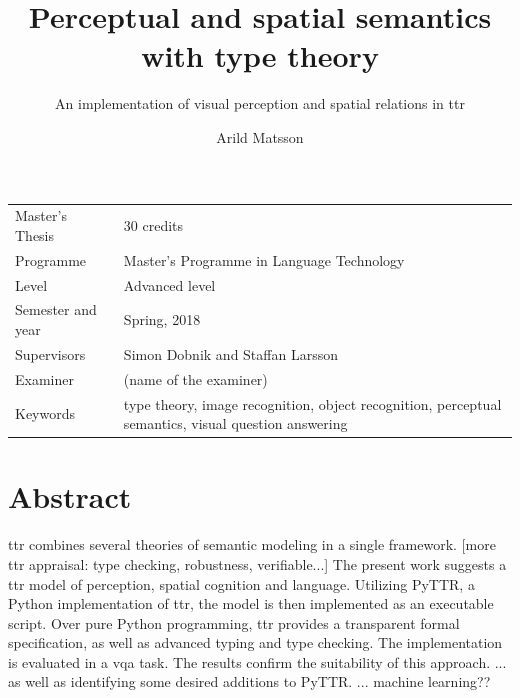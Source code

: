 \documentclass[11pt, a4paper]{article}
\title{Perceptual and spatial semantics with type theory}
\subtitle{An implementation of visual perception and spatial relations in \gls{ttr}}
\author{Arild Matsson}
\date{}
\begin{document}
\begin{titlepage}

\maketitle

\vfill

\begingroup
\renewcommand*{\arraystretch}{1.2}
\begin{tabular}{l@{\hskip 20mm}l}
\hline
Master's Thesis & 30 credits\\
Programme & Master’s Programme in Language Technology\\
Level & Advanced level \\
Semester and year & Spring, 2018\\
Supervisors & Simon Dobnik and Staffan Larsson\\
Examiner & (name of the examiner)\\
Keywords & type theory, image recognition, object recognition, perceptual semantics, visual question answering
\end{tabular}
\endgroup

\thispagestyle{empty}
\end{titlepage}

\newpage
\singlespacing
\glsresetall
\section*{Abstract}

\Gls{ttr} combines several theories of semantic modeling in a single framework.
[more ttr appraisal: type checking, robustness, verifiable...]
The present work suggests a \gls{ttr} model of perception, spatial cognition and language.
Utilizing PyTTR, a Python implementation of \gls{ttr}, the model is then implemented as an executable script.
Over pure Python programming, \gls{ttr} provides a transparent formal specification, as well as advanced typing and type checking.
The implementation is evaluated in a \acrlong{vqa} task.
The results confirm the suitability of this approach.
... as well as identifying some desired additions to PyTTR.
... machine learning??
\end{document}
